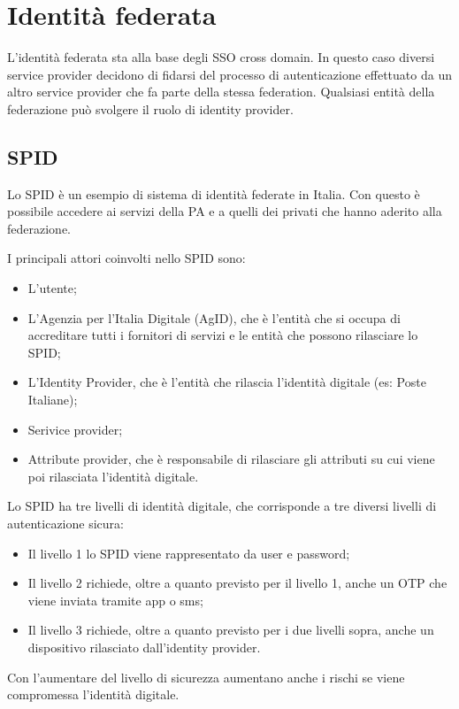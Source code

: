\section{Identità federata}
L'identità federata sta alla base degli SSO cross domain. In questo caso diversi service provider decidono di fidarsi del processo di autenticazione effettuato da un altro service provider che fa parte della stessa federation. Qualsiasi entità della federazione può svolgere il ruolo di identity provider. 

\subsection{SPID}
Lo SPID è un esempio di sistema di identità federate in Italia. Con questo è possibile accedere ai servizi della PA e a quelli dei privati che hanno aderito alla federazione. 

\noindent I principali attori coinvolti nello SPID sono:
\begin{itemize}
    \item L'utente;
    \item L'Agenzia per l'Italia Digitale (AgID), che è l'entità che si occupa di accreditare tutti i fornitori di servizi e le entità che possono rilasciare lo SPID;
    \item L'Identity Provider, che è l'entità che rilascia l'identità digitale (es: Poste Italiane);
    \item Serivice provider;
    \item Attribute provider, che è responsabile di rilasciare gli attributi su cui viene poi rilasciata l'identità digitale. 
\end{itemize}

\noindent Lo SPID ha tre livelli di identità digitale, che corrisponde a tre diversi livelli di autenticazione sicura:
\begin{itemize}
    \item Il livello 1 lo SPID viene rappresentato da user e password;
    \item Il livello 2 richiede, oltre a quanto previsto per il livello 1,  anche un OTP che viene inviata tramite app o sms;
    \item Il livello 3 richiede, oltre a quanto previsto per i due livelli sopra, anche un dispositivo rilasciato dall'identity provider.
\end{itemize}

\noindent Con l'aumentare del livello di sicurezza aumentano anche i rischi se viene compromessa l'identità digitale.

